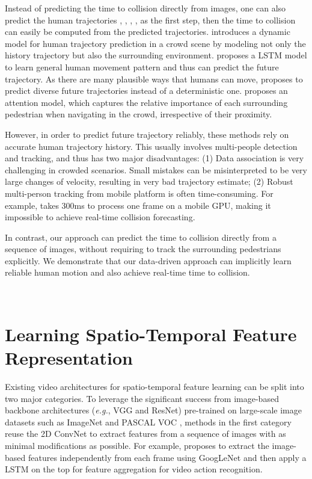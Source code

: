 Instead of predicting the time to collision directly from images, one can also predict the human trajectories \cite{socialGAN}, \cite{socialLSTM}, \cite{anirudh}, \cite{2009YoullNW}, \cite{ziebart2009planning} as the first step, then the time to collision can easily be computed from the predicted trajectories.
\cite{2009YoullNW} introduces a dynamic model for human trajectory prediction in a crowd scene by modeling not only the history trajectory but also the surrounding environment. \cite{socialLSTM} proposes a LSTM model to learn general human movement pattern and thus can predict the future trajectory. As there are many plausible ways that humans can move, \cite{socialGAN} proposes to predict diverse future trajectories instead of a deterministic one. \cite{anirudh} proposes an attention model, which captures the relative importance of each surrounding pedestrian when navigating in the crowd, irrespective of their proximity.


However, in order to predict future trajectory reliably, these methods rely on accurate human trajectory history. This usually involves multi-people detection and tracking, and thus has two major disadvantages: (1) Data association is very challenging in crowded scenarios. Small mistakes can be misinterpreted to be very large changes of velocity, resulting in very bad trajectory estimate; (2) Robust multi-person tracking from mobile platform is often time-consuming. For example, \cite{Andreas} takes 300ms to process one frame on a mobile GPU, making it impossible to achieve real-time collision forecasting. 

In contrast, our approach can predict the time to collision directly from a sequence of images, without requiring to track the surrounding pedestrians explicitly. We demonstrate that our data-driven approach can implicitly learn reliable human motion and also achieve real-time time to collision.


\noindent\\
\section{Learning Spatio-Temporal Feature Representation}

Existing video architectures for spatio-temporal feature learning can be split into two major categories. To leverage the significant success from image-based backbone architectures (\emph{e.g.}, VGG and ResNet) pre-trained on large-scale image datasets such as ImageNet \cite{imagenet} and PASCAL VOC \cite{pascalVOC}, methods in the first category reuse the 2D ConvNet to extract features from a sequence of images with as minimal modifications as possible. For example, \cite{BeyondSS} proposes to extract the image-based features independently from each frame using GoogLeNet and then apply a LSTM \cite{lstm} on the top for feature aggregation for video action recognition.

